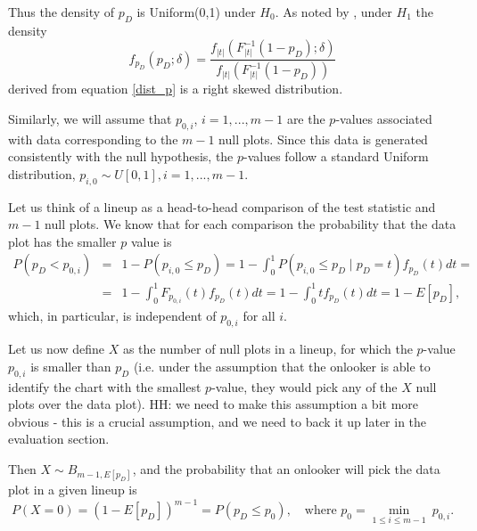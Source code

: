 \documentclass{article}
\newcommand{\blue}[1]{{\color{blue} #1}}
\newcommand{\red}[1]{{\color{red} #1}}
\begin{document}
Thus the density of $p_D$ is Uniform(0,1)  under $H_0$. As noted by \cite{Ruppert:2007}, under $H_1$ the density $$f_{p_D}(p_D; \delta)= \frac{f_{|t|}(F_{|t|}^{-1}(1-p_D);\delta)}{f_{|t|}(F_{|t|}^{-1}(1-p_D))}$$ derived from equation \ref{dist_p}  is a right skewed distribution.  



\blue{Similarly, we will assume that $p_{0,i}$, $i=1, ..., m-1$ are the $p$-values associated with data corresponding to the $m-1$ null plots. Since this data is generated consistently with the null hypothesis, the $p$-values follow a standard Uniform distribution, $p_{i,0} \sim U[0,1], i= 1, ..., m-1$. }


Let us think of a lineup as a head-to-head comparison of the test statistic and $m-1$ null plots. 
We know that for each comparison the probability that the data plot has the smaller $p$ value is 
\begin{eqnarray*}
P(p_D < p_{0,i}) &=& 1 - P(p_{i,0} \le p_D) = 1- \int_0^1  P(p_{i,0} \le p_D \mid p_D=t) f_{p_D}(t) dt =  \\
&=& 1 - \int_0^1 F_{p_{0,i}}(t) f_{p_D}(t) dt = 1 - \int_0^1 t f_{p_D}(t) dt = 1 - E[p_D],
\end{eqnarray*}
which, in particular, is independent of $p_{0,i}$ for all $i$.

Let us now define $X$ as the number of null plots in a lineup, for which the $p$-value $p_{0,i}$ is smaller than $p_D$ (i.e. under the assumption that the onlooker is able to identify the chart with the smallest $p$-value, they would pick any of the $X$  null plots over the data plot). 
\red{HH: we need to make this assumption a bit more obvious - this is a crucial assumption, and we need to back it up later in the evaluation section.}

Then $X \sim B_{m-1, E[p_D]}$, and the probability that an onlooker will pick the data plot in a given lineup is 
\[
P(X=0) = \left(1 - E[p_D] \right)^{m-1} = P(p_D \le p_0), \ \ \ \text{ where } p_0 = \min_{1 \le i \le m-1}  \ p_{0,i}.
\]


\end{document}
